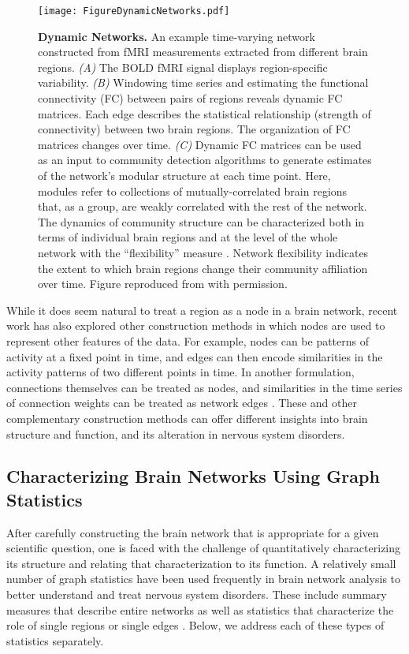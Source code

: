 \documentclass[12pt]{article}
\begin{document}
 \begin{figure}[h!]
 	\centerline{\texttt{[image: FigureDynamicNetworks.pdf]}}
 	\caption{\textbf{Dynamic Networks.} An example time-varying network constructed from fMRI measurements extracted from different brain regions. \emph{(A)} The BOLD fMRI signal displays region-specific variability. \emph{(B)} Windowing time series and estimating the functional connectivity (FC) between pairs of regions reveals dynamic FC matrices. Each edge describes the statistical relationship (strength of connectivity) between two brain regions. The organization of FC matrices changes over time. \emph{(C)} Dynamic FC matrices can be used as an input to community detection algorithms to generate estimates of the network’s modular structure at each time point. Here, modules refer to collections of mutually-correlated brain regions that, as a group, are weakly correlated with the rest of the network. The dynamics of community structure can be characterized both in terms of individual brain regions and at the level of the whole network with the ``flexibility'' measure \cite{bassett2011dynamic}. Network flexibility indicates the extent to which brain regions change their community affiliation over time. Figure reproduced from \cite{mattar2016flexible} with permission.}\label{fig:dynamicnetwork}
 	\centering

 \end{figure}

While it does seem natural to treat a region as a node in a brain network, recent work has also explored other construction methods in which nodes are used to represent other features of the data. For example, nodes can be patterns of activity at a fixed point in time, and edges can then encode similarities in the activity patterns of two different points in time. In another formulation, connections themselves can be treated as nodes, and similarities in the time series of connection weights can be treated as network edges \cite{davison2016individual}. These and other complementary construction methods can offer different insights into brain structure and function, and its alteration in nervous system disorders.


\subsection*{Characterizing Brain Networks Using Graph Statistics}

After carefully constructing the brain network that is appropriate for a given scientific question, one is faced with the challenge of quantitatively characterizing its structure and relating that characterization to its function. A relatively small number of graph statistics have been used frequently in brain network analysis to better understand and treat nervous system disorders. These include summary measures that describe entire networks as well as statistics that characterize the role of single regions or single edges \cite{rubinov2010complex}. Below, we address each of these types of statistics separately.
\end{document}
